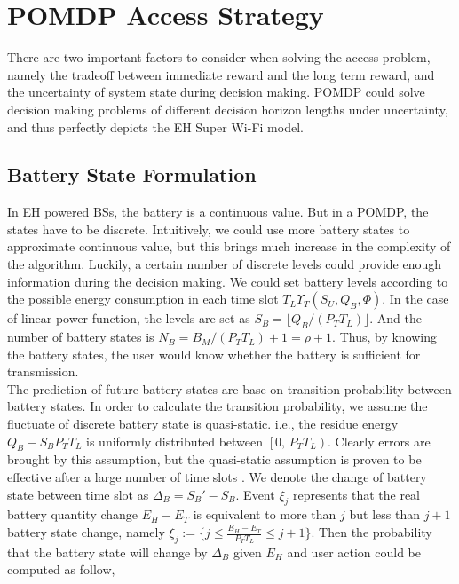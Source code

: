 \documentclass[conference]{IEEEtran}
\begin{document}
\section{POMDP Access Strategy}
There are two important factors to consider when solving the access problem,
namely the tradeoff between immediate reward and the long term reward, and
the uncertainty of system state during decision making.
POMDP could solve decision making problems
of different decision horizon lengths under uncertainty,
and thus perfectly depicts the EH Super Wi-Fi model.
\subsection{Battery State Formulation}
In EH powered BSs, the battery is a continuous value.
But in a POMDP, the states have to be discrete.
Intuitively, we could use more battery states to approximate continuous value,
but this brings much increase in the complexity of the algorithm.
Luckily, a certain number of discrete levels could provide enough information during the decision making.
We could set battery levels according to the possible energy consumption in each time slot \(T_L\Upsilon_T(S_U,Q_B,\Phi)\).
In the case of linear power function, the levels are set as \(S_B = \lfloor Q_B / \left(P_TT_L\right) \rfloor\).
And the number of battery states is \(N_B = B_M / \left(P_TT_L\right) +1 = \rho + 1\).
Thus, by knowing the battery states,
the user would know whether the battery is sufficient for transmission.\\
\indent
The prediction of future battery states are base on transition probability between battery states.
In order to calculate the transition probability,
we assume the fluctuate of discrete battery state is quasi-static.
i.e., the residue energy \(Q_B - S_BP_TT_L\) is uniformly distributed between \(\left[0,\,P_TT_L\right)\).
Clearly errors are brought by this assumption,
but the quasi-static assumption is proven to be effective after a large number of time slots \cite{data}.
We denote the change of battery state between time slot as \(\Delta_B = S_{B}' - S_B\).
Event \(\xi_j\) represents that the real battery quantity change \(E_H - E_T\)
is equivalent to more than \(j\) but less than \(j+1\) battery state change, namely
\(\xi_j := \{j\leq \frac{E_H - E_T}{P_TT_L} \le j+1\}\).
Then the probability that the battery state will change by \(\Delta_B\)
given \(E_H\) and user action could be computed as follow,
\end{document}
